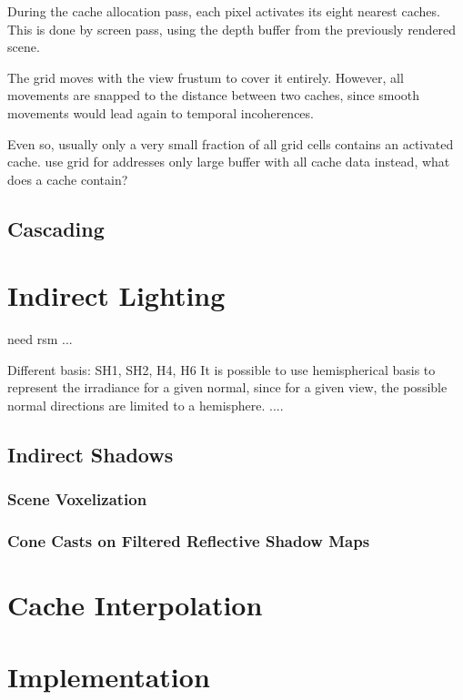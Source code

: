 \documentclass[thesis.tex]{subfiles}
\begin{document}
During the cache allocation pass, each pixel activates its eight nearest caches.
This is done by screen pass, using the depth buffer from the previously rendered scene.

The grid moves with the view frustum to cover it entirely.
However, all movements are snapped to the distance between two caches, since smooth movements would lead again to temporal incoherences.

Even so, usually only a very small fraction of all grid cells contains an activated cache.
use grid for addresses only
large buffer with all cache data instead,
what does a cache contain?

\subsection{Cascading}

\section{Indirect Lighting}

need rsm ... 


Different basis: SH1, SH2, H4, H6
It is possible to use hemispherical basis to represent the irradiance for a given normal, since for a given view, the possible normal directions are limited to a hemisphere. ....

\subsection{Indirect Shadows}

\subsubsection{Scene Voxelization}

\subsubsection{Cone Casts on Filtered Reflective Shadow Maps}


\section{Cache Interpolation}



\section{Implementation}
\end{document}
